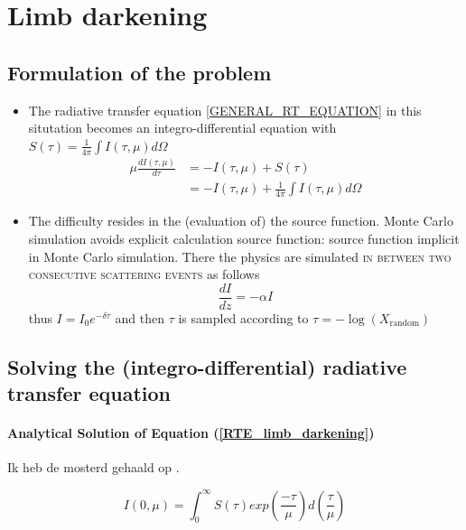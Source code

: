 \documentclass[../main/main.tex]{subfiles}
\begin{document}
\newpage
\section{Limb darkening}
\label{limb_darkening_program_discussion}

\subsection{Formulation of the problem}
\begin{itemize}
\item The radiative transfer equation \ref{GENERAL_RT_EQUATION} in this situtation becomes an integro-differential equation with  $S(\tau) = \frac{1}{4\pi} \int I(\tau,\mu) d\Omega$
\begin{equation}
\begin{aligned}
\mu \frac{dI(\tau,\mu)}{d\tau} &= -I(\tau,\mu) + S(\tau)  \\ 
&= -I(\tau,\mu)  + \frac{1}{4\pi} \int I(\tau,\mu) d\Omega
\end{aligned}
\label{RTE_limb_darkening}
\end{equation}

\item The difficulty resides in the (evaluation of) the source function. Monte Carlo simulation avoids explicit calculation source function: source function implicit in Monte Carlo simulation. There the physics are simulated \textsc{in between two consecutive scattering events} as follows
\begin{equation}
\frac{dI}{dz} = -\alpha I 
\end{equation}
thus $I = I_0 e^{-\delta \tau}$ and then $\tau$ is sampled according to $\tau = - \log(X_{\text{random}})$
\end{itemize}

\subsection{Solving the (integro-differential) radiative transfer equation}
\paragraph{Analytical Solution of Equation (\ref{RTE_limb_darkening})}
Ik heb de mosterd gehaald op \cite{Dublin_limb_darkening}.

\begin{equation}
I(0,\mu) = \int_0^{\infty} S(\tau) exp\left( \frac{-\tau}{\mu} \right) d\left( \frac{\tau}{\mu} \right)
\end{equation}
\end{document}

